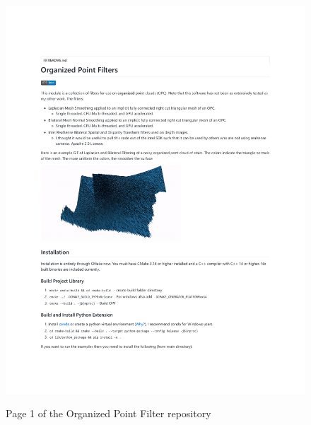 \begin{figure}[h!]
    \centering\includegraphics[page=1, trim=1.2in 1.2in 1.2in 1.15in, width=.82\linewidth]{appendix_1/imgs/OPFReadme.pdf}
    \label{fig:apx1_opc1}
    \caption{Page 1 of the Organized Point Filter repository} 
\end{figure}

